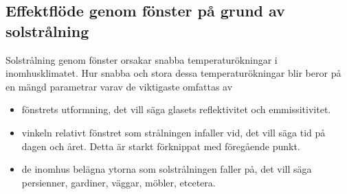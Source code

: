 \subsection{Effektflöde genom fönster på grund av solstrålning}

\begin{comment}
Förhållande mellan väderstationens uppmätta värde och tillförd effekt till lägenhet:
- beroende av fönstrets och grannbyggnaders position
- beroende av tid på dygnet och året
- persienner och gardiner försvårar!
- hur mycket kan maximalt reflekteras ut?

I diskussion:
- Hur kan man koppla detta till värmesystemet?
	- Registrera intensitet, tid på dygnet och datum
	- Beräkna ungefärlig tillförd effekt
	- Kompensera genom att säga till värmesystemet att minska/stänga inflödet
- Blir det lättare att helt enkelt mäta temperaturen i rummet och helt enkelt gå utifrån det? Vad är mer kostnadseffektivt?

-Konduktion och konvektion räknas tillsammans med väggar.. 

-Strålning
\end{comment}

Solstrålning genom fönster orsakar snabba temperaturökningar i inomhusklimatet. Hur snabba och stora dessa temperaturökningar blir beror på en mängd parametrar varav de viktigaste omfattas av
\begin{itemize}
\item{
fönstrets utformning, det vill säga glasets reflektivitet och emmissitivitet.
}
\item{
vinkeln relativt fönstret som strålningen infaller vid, det vill säga tid på dagen och året. Detta är starkt förknippat med föregående punkt. 
}
\item{
de inomhus belägna ytorna som solstrålningen faller på, det vill säga persienner, gardiner, väggar, möbler, etcetera.
}
\end{itemize} 
